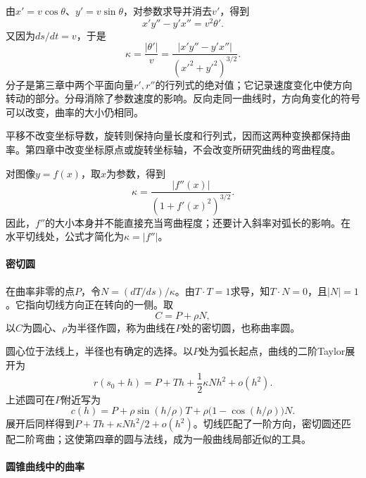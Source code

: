由\(x'=v\cos\theta\)、\(y'=v\sin\theta\)，对参数求导并消去\(v'\)，得到
\begin{equation*}
 x'y''-y'x''=v^2\theta'.
\end{equation*}
又因为\(ds/dt=v\)，于是
\begin{equation}\label{eq:calculus-parametric-curvature}
 \kappa=\frac{|\theta'|}{v}
 =\frac{|x'y''-y'x''|}{(x'^2+y'^2)^{3/2}}.
\end{equation}
分子是第三章中两个平面向量\(r',r''\)的行列式的绝对值；它记录速度变化中使方向转动的部分。分母消除了参数速度的影响。反向走同一曲线时，方向角变化的符号可以改变，曲率的大小仍相同。

平移不改变坐标导数，旋转则保持向量长度和行列式，因而这两种变换都保持曲率。第四章中改变坐标原点或旋转坐标轴，不会改变所研究曲线的弯曲程度。

对图像\(y=f(x)\)，取\(x\)为参数，得到
\begin{equation}\label{eq:calculus-graph-curvature}
 \kappa=\frac{|f''(x)|}{(1+f'(x)^2)^{3/2}}.
\end{equation}
因此，\(f''\)的大小本身并不能直接充当弯曲程度；还要计入斜率对弧长的影响。在水平切线处，公式才简化为\(\kappa=|f''|\)。

\paragraph{密切圆} \mbox{}

在曲率非零的点\(P\)，令\(N=(dT/ds)/\kappa\)。由\(T\cdot T=1\)求导，知\(T\cdot N=0\)，且\(|N|=1\)。它指向切线方向正在转向的一侧。取
\begin{equation*}
 C=P+\rho N,
\end{equation*}
以\(C\)为圆心、\(\rho\)为半径作圆，称为曲线在\(P\)处的{\heiti{}密切圆}，也称{\heiti{}曲率圆}。

圆心位于法线上，半径也有确定的选择。以\(P\)处为弧长起点，曲线的二阶Taylor展开为
\begin{equation*}
 r(s_0+h)=P+Th+\frac12\kappa Nh^2+o(h^2).
\end{equation*}
上述圆可在\(P\)附近写为
\begin{equation*}
 c(h)=P+\rho\sin(h/\rho)T+\rho\bigl(1-\cos(h/\rho)\bigr)N.
\end{equation*}
展开后同样得到\(P+Th+\kappa Nh^2/2+o(h^2)\)。切线匹配了一阶方向，密切圆还匹配二阶弯曲；这使第四章的圆与法线，成为一般曲线局部近似的工具。

\paragraph{圆锥曲线中的曲率} \mbox{}

